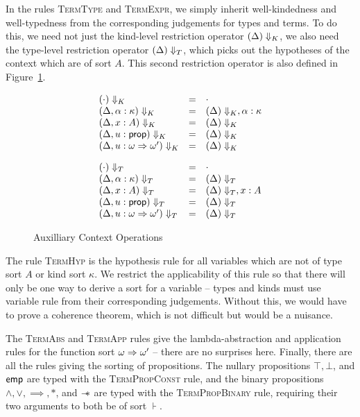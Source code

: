 In the rules \textsc{TermType} and \textsc{TermExpr}, we simply
inherit well-kindedness and well-typedness from the corresponding
judgements for types and terms. To do this, we need not just the
kind-level restriction operator $({\Delta})\Downarrow_K$, we also need
the type-level restriction operator $({\Delta})\Downarrow_T$, which
picks out the hypotheses of the context which are of sort $A$. This
second restriction operator is also defined in
Figure~\ref{context-ops}.

\begin{figure}
\begin{displaymath}
\begin{array}{lcl}
({\cdot})\Downarrow_K                 & = & \cdot \\
({\Delta, \alpha:\kappa})\Downarrow_K & = & ({\Delta})\Downarrow_K, \alpha:\kappa \\
({\Delta, x:A})\Downarrow_K           & = & ({\Delta})\Downarrow_K \\
({\Delta, u:\mbox{\textsf{{prop}}}})\Downarrow_K     & = & ({\Delta})\Downarrow_K \\
({\Delta, u:\omega \Rightarrow \omega'})\Downarrow_K & = & ({\Delta})\Downarrow_K \\[1em]

({\cdot})\Downarrow_T                 & = & \cdot \\
({\Delta, \alpha:\kappa})\Downarrow_T & = & ({\Delta})\Downarrow_T \\
({\Delta, x:A})\Downarrow_T           & = & ({\Delta})\Downarrow_T, x:A \\
({\Delta, u:\mbox{\textsf{{prop}}}})\Downarrow_T     & = & ({\Delta})\Downarrow_T \\
({\Delta, u:\omega \Rightarrow \omega'})\Downarrow_T & = & ({\Delta})\Downarrow_T \\
\end{array}
\end{displaymath}
\caption{Auxilliary Context Operations}
\label{context-ops}  
\end{figure}

The rule \textsc{TermHyp} is the hypothesis rule for all variables
which are not of type sort $A$ or kind sort $\kappa$. We restrict the
applicability of this rule so that there will only be one way to
derive a sort for a variable -- types and kinds must use variable rule
from their corresponding judgements. Without this, we would have to
prove a coherence theorem, which is not difficult but would be a
nuisance.
 
The \textsc{TermAbs} and \textsc{TermApp} rules give the lambda-abstraction
and application rules for the function sort $\omega \Rightarrow \omega'$ -- there
are no surprises here. Finally, there are all the rules giving the sorting
of propositions. The nullary propositions $\top, \bot$, and $\mathsf{emp}$ are
typed with the \textsc{TermPropConst} rule, and the binary propositions
$\land, \vee, \implies, *$, and $-\!\!*$ are typed with the \textsc{TermPropBinary}
rule, requiring their two arguments to both be of sort $\assert$. 

